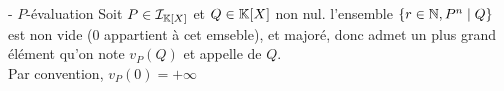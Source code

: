 


\begin{definition}{16.102}{ - $P$-évaluation}
    Soit $P \in \mathcal{I}_{\mathbb{K}[X]}$ et $Q \in \mathbb{K}[X]$ non nul. l'ensemble $\{r \in \mathbb{N}, P^n \mid Q\}$ est non vide (0 appartient à cet emseble), et majoré, donc admet un plus grand élément qu'on note $v_P(Q)$ et appelle  de $Q$. \\ Par convention, $v_P(0) = +\infty$
\end{definition}
